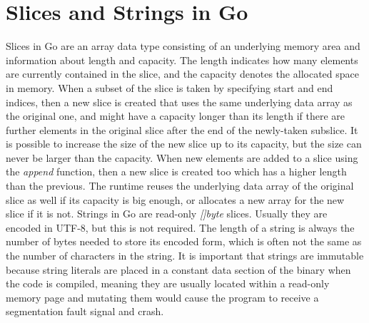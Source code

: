 
\section{Slices and Strings in Go}\label{sec:background:slices}

Slices in Go are an array data type consisting of an underlying memory area and information about length and capacity.
The length indicates how many elements are currently contained in the slice, and the capacity denotes the allocated
space in memory.
When a subset of the slice is taken by specifying start and end indices, then a new slice is created that uses the same
underlying data array as the original one, and might have a capacity longer than its length if there are further
elements in the original slice after the end of the newly-taken subslice.
It is possible to increase the size of the new slice up to its capacity, but the size can never be larger than the
capacity.
When new elements are added to a slice using the \textit{append} function, then a new slice is created too which has a
higher length than the previous.
The runtime reuses the underlying data array of the original slice as well if its capacity is big enough, or allocates
a new array for the new slice if it is not.
Strings in Go are read-only \textit{[]byte} slices.
Usually they are encoded in UTF-8, but this is not required.
The length of a string is always the number of bytes needed to store its encoded form, which is often not the same as
the number of characters in the string.
It is important that strings are immutable because string literals are placed in a constant data section of the binary
when the code is compiled, meaning they are usually located within a read-only memory page and mutating them would cause
the program to receive a segmentation fault signal and crash.



